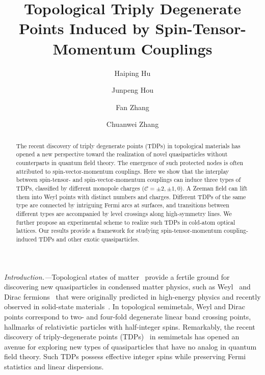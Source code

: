 \documentclass[aps,prl,floatfix,twocolumn,reprint]{revtex4}
\begin{document}
\title{Topological Triply Degenerate Points Induced by Spin-Tensor-Momentum Couplings}
\author{Haiping Hu}
\author{Junpeng Hou}
\author{Fan Zhang}
\author{Chuanwei Zhang}

\begin{abstract}
The recent discovery of triply degenerate points (TDPs) in topological
materials has opened a new perspective toward the realization of novel
quasiparticles without counterparts in quantum field theory. The emergence
of such protected nodes is often attributed to spin-vector-momentum
couplings. Here we show that the interplay between spin-tensor- and
spin-vector-momentum couplings can induce three types of TDPs, classified by
different monopole charges ($\mathcal{C}=\pm 2,\pm 1,0$). 
A Zeeman field can lift them into Weyl points with distinct numbers and
charges. Different TDPs of the same
type are connected by intriguing Fermi arcs at surfaces, and transitions
between different types are accompanied by level crossings along
high-symmetry lines. We further propose an experimental scheme to realize
such TDPs in cold-atom optical lattices. Our results provide a framework for
studying spin-tensor-momentum coupling-induced TDPs and other exotic
quasiparticles.
\end{abstract}

\maketitle

{\color{blue}\textit{Introduction.---}}Topological states of matter~\cite%
{review1,review2} provide a fertile ground for discovering new
quasiparticles in condensed matter physics, such as Weyl~\cite%
{weylbook,weylmurakami,weylxgwan,weylbalents,weyl1,weyl2,weyl3,weyl4,weyl5,weyl6,weyl7,weyl8,weyl9,weyl10,CCL,ortix,ypz}
and Dirac fermions~\cite{ypz,dirac1,dirac2,dirac3,dirac4,dirac5,dirac6} that
were originally predicted in high-energy physics and recently observed in
solid-state materials~\cite{semimetal}. In topological semimetals, Weyl and
Dirac points correspond to two- and four-fold degenerate linear band
crossing points, hallmarks of relativistic particles with half-integer
spins. Remarkably, the recent discovery of triply-degenerate points (TDPs)~%
\cite{tf1,tf2,tf3,tf4,tf5,tf6,tf7,tf8,tf9,tf10,tf11,tf12,tf13} in
semimetals has opened an avenue for exploring new types of quasiparticles
that have no analog in quantum field theory. Such TDPs possess effective
integer spins while preserving Fermi statistics and linear dispersions.
\end{document}

